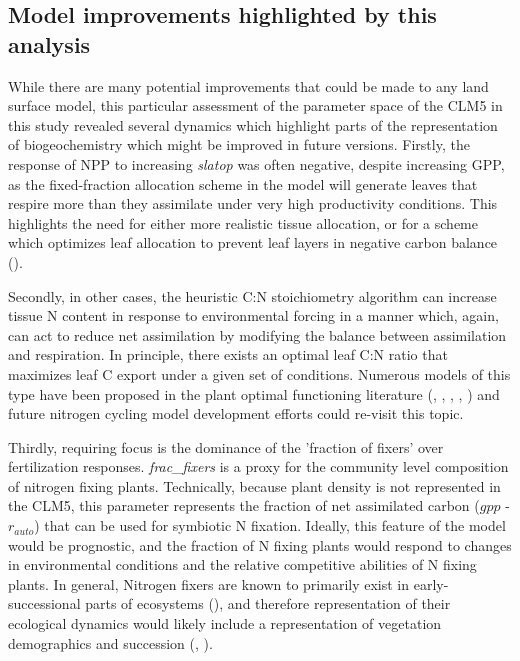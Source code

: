 \documentclass[draft,linenumbers]{agujournal}
\begin{document}
\subsection{Model improvements highlighted by this analysis}
While there are many potential improvements that could be made to any land surface model, this particular assessment of the parameter space of the CLM5 in this study revealed several dynamics which highlight parts of the representation of biogeochemistry which might be improved in future versions.  
Firstly, the response of NPP to increasing \emph{slatop} was often negative, despite increasing GPP, as the fixed-fraction allocation scheme in the model will generate leaves that respire more than they assimilate under very high productivity conditions. This highlights the need for either more realistic tissue allocation, or for a scheme which optimizes leaf allocation to prevent leaf layers in negative carbon balance (\cite{fisher2010}).  

Secondly, in other cases, the heuristic C:N stoichiometry algorithm can increase tissue N content in response to environmental forcing in a manner which, again, can act to reduce net assimilation by modifying the balance between assimilation and respiration. In principle, there exists an optimal leaf C:N ratio that maximizes leaf C export under a given set of conditions.  Numerous models of this type have been proposed in the plant optimal functioning literature (\cite{vanwijk2003}, \cite{mcmurtrie2011}, \cite{anten2011} \cite{franklin2012}, \cite{mcmurtrie2013}, \cite{thomas2014}) and future nitrogen cycling model development efforts could re-visit this topic.  

Thirdly, requiring focus is the dominance of the 'fraction of fixers' over fertilization responses. \emph{frac\_fixers} is a proxy for the community level composition of nitrogen fixing plants. Technically, because plant density is not represented in the CLM5, this parameter represents the fraction of net assimilated carbon ($gpp$ - $r_{auto}$) that can be used for symbiotic N fixation. Ideally, this feature of the model would be prognostic, and the fraction of N fixing plants would respond to changes in environmental conditions and the relative competitive abilities of N fixing plants. In general, Nitrogen fixers are known to primarily exist in early-successional parts of ecosystems (\cite{vitousek1989}), and therefore representation of their ecological dynamics would likely include a representation of vegetation demographics and succession (\cite{fisher2018vegetation}, \cite{trugman2016climate}). 
\end{document}
